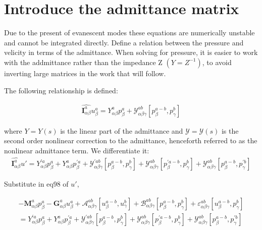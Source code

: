 \documentclass{Note}
\begin{document}
\section{Introduce the admittance matrix}

Due to the present of evanescent modes these equations are numerically unstable and cannot be integrated directly. Define a relation between the pressure and velicity in terms of the admittance. When solving for pressure, it is easier to work with the addmittance rather than the impedance Z $(Y=Z^{-1})$, to avoid inverting large matrices in the work that will follow.

The following relationship is defined:

\begin{equation}
\begin{aligned}
\widehat{\textbf{I}_{\alpha\beta}^a}  u_{\beta}^a=Y_{\alpha\beta}^a p_{\beta}^a+\mathcal{Y}_{\alpha\beta\gamma}^{ab}[p_{\beta}^{a-b},p_{\gamma}^{b}]
\end{aligned}
\end{equation}

where $Y=Y(s)$ is the linear part of the admittance and $\mathcal{Y}=\mathcal{Y}(s)$ is the second order nonlinear correction to the admittance, henceforth referred to as the  nonlinear admittance term. We differentiate it:
\begin{equation}
\begin{aligned}
\widehat{\textbf{I}_{\alpha\beta}^a} u'={Y}_{\alpha\beta}^{'a} p_{\beta}^a +Y_{\alpha\beta}^{a} p_{\beta}^{'a}+\mathcal{Y}_{\alpha\beta\gamma}^{'ab}[p_{\beta}^{a-b},p_{\gamma}^{b}]+\mathcal{Y}_{\alpha\beta\gamma}^{ab}[p_{\beta}^{'a-b},p_{\gamma}^{b}]+\mathcal{Y}_{\alpha\beta\gamma}^{ab}[p_{\beta}^{a-b},p_{\gamma}^{'b}]
\end{aligned}
\end{equation}

Substitute in eq98 of $u'$,

 \begin{equation}
\begin{aligned}
-\textbf{M}_{\alpha\beta}^a p_\beta^a -\textbf{G}_{\alpha\beta}^a u_\beta^a+ \mathcal{A}_{\alpha\beta\gamma}^{ab}[u_{\beta}^{a-b},u_{\gamma}^{b}]+\mathcal{B}_{\alpha\beta\gamma}^{ab}[p_{\beta}^{a-b},p_{\gamma}^{b}]+\varepsilon_{\alpha\beta\gamma}^{ab}[u_{\beta}^{a-b},p_{\gamma}^{b}]\\={Y}_{\alpha\beta}^{'a} p_{\beta}^a +Y_{\alpha\beta}^{a} p_{\beta}^{'a}+\mathcal{Y}_{\alpha\beta\gamma}^{'ab}[p_{\beta}^{a-b},p_{\gamma}^{b}]+\mathcal{Y}_{\alpha\beta\gamma}^{ab}[p_{\beta}^{'a-b},p_{\gamma}^{b}]+\mathcal{Y}_{\alpha\beta\gamma}^{ab}[p_{\beta}^{a-b},p_{\gamma}^{'b}]
\end{aligned}
\end{equation}
\end{document}
